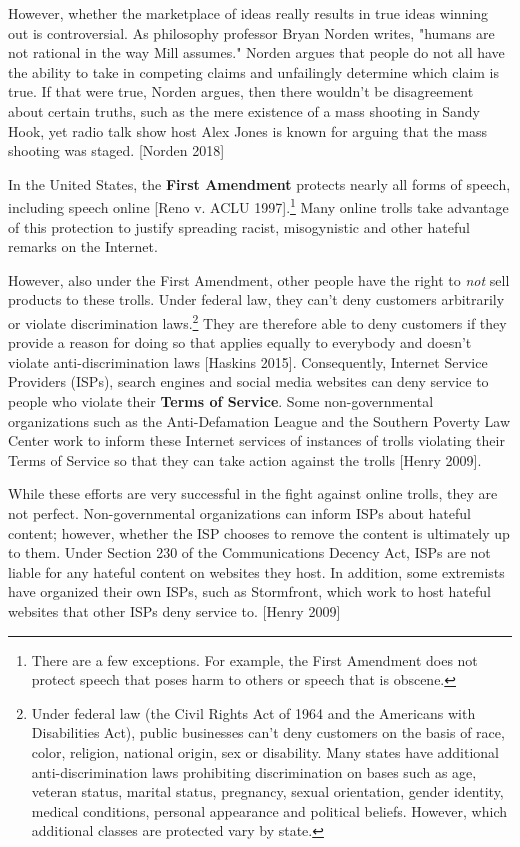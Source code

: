 \documentclass[class=book, crop=false]{standalone}
\providecommand{\keyterm}[1]{\textbf{#1}\marginnote{\scriptsize \textbf{#1}}}
\begin{document}
However, whether the marketplace of ideas really results in true ideas winning out is controversial. As philosophy professor Bryan Norden writes, "humans are not rational in the way Mill assumes." Norden argues that people do not all have the ability to take in competing claims and unfailingly determine which claim is true. If that were true, Norden argues, then there wouldn't be disagreement about certain truths, such as the mere existence of a mass shooting in Sandy Hook, yet radio talk show host Alex Jones is known for arguing that the mass shooting was staged. [Norden 2018]

In the United States, the \keyterm{First Amendment} protects nearly all forms of speech, including speech online [Reno v. ACLU 1997].\footnote{There are a few exceptions. For example, the First Amendment does not protect speech that poses harm to others or speech that is obscene.} Many online trolls take advantage of this protection to justify spreading racist, misogynistic and other hateful remarks on the Internet.

However, also under the First Amendment, other people have the right to \textit{not} sell products to these trolls. Under federal law, they can't deny customers arbitrarily or violate discrimination laws.\footnote{Under federal law (the Civil Rights Act of 1964 and the Americans with Disabilities Act), public businesses can't deny customers on the basis of race, color, religion, national origin, sex or disability. Many states have additional anti-discrimination laws prohibiting discrimination on bases such as age, veteran status, marital status, pregnancy, sexual orientation, gender identity, medical conditions, personal appearance and political beliefs. However, which additional classes are protected vary by state.} They are therefore able to deny customers if they provide a reason for doing so that applies equally to everybody and doesn't violate anti-discrimination laws [Haskins 2015]. Consequently, Internet Service Providers (ISPs), search engines and social media websites can deny service to people who violate their \keyterm{Terms of Service}. Some non-governmental organizations such as the Anti-Defamation League and the Southern Poverty Law Center work to inform these Internet services of instances of trolls violating their Terms of Service so that they can take action against the trolls [Henry 2009].

While these efforts are very successful in the fight against online trolls, they are not perfect. Non-governmental organizations can inform ISPs about hateful content; however, whether the ISP chooses to remove the content is ultimately up to them. Under Section 230 of the Communications Decency Act, ISPs are not liable for any hateful content on websites they host. In addition, some extremists have organized their own ISPs, such as Stormfront, which work to host hateful websites that other ISPs deny service to. [Henry 2009]
\end{document}
